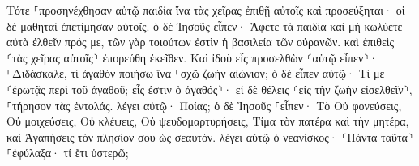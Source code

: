 \documentclass{openreader}
\begin{document}
Τότε ⸀προσηνέχθησαν αὐτῷ παιδία ἵνα τὰς χεῖρας ἐπιθῇ αὐτοῖς καὶ προσεύξηται· οἱ δὲ μαθηταὶ ἐπετίμησαν αὐτοῖς. 
ὁ δὲ Ἰησοῦς εἶπεν· Ἄφετε τὰ παιδία καὶ μὴ κωλύετε αὐτὰ ἐλθεῖν πρός με, τῶν γὰρ τοιούτων ἐστὶν ἡ βασιλεία τῶν οὐρανῶν. 
καὶ ἐπιθεὶς ⸂τὰς χεῖρας αὐτοῖς⸃ ἐπορεύθη ἐκεῖθεν. 
Καὶ ἰδοὺ εἷς προσελθὼν ⸂αὐτῷ εἶπεν⸃· ⸀Διδάσκαλε, τί ἀγαθὸν ποιήσω ἵνα ⸀σχῶ ζωὴν αἰώνιον; 
ὁ δὲ εἶπεν αὐτῷ· Τί με ⸂ἐρωτᾷς περὶ τοῦ ἀγαθοῦ; εἷς ἐστιν ὁ ἀγαθός⸃· εἰ δὲ θέλεις ⸂εἰς τὴν ζωὴν εἰσελθεῖν⸃, ⸀τήρησον τὰς ἐντολάς. 
λέγει αὐτῷ· Ποίας; ὁ δὲ Ἰησοῦς ⸀εἶπεν· Τὸ Οὐ φονεύσεις, Οὐ μοιχεύσεις, Οὐ κλέψεις, Οὐ ψευδομαρτυρήσεις, 
Τίμα τὸν πατέρα καὶ τὴν μητέρα, καὶ Ἀγαπήσεις τὸν πλησίον σου ὡς σεαυτόν. 
λέγει αὐτῷ ὁ νεανίσκος· ⸂Πάντα ταῦτα⸃ ⸀ἐφύλαξα· τί ἔτι ὑστερῶ; 
\end{document}
